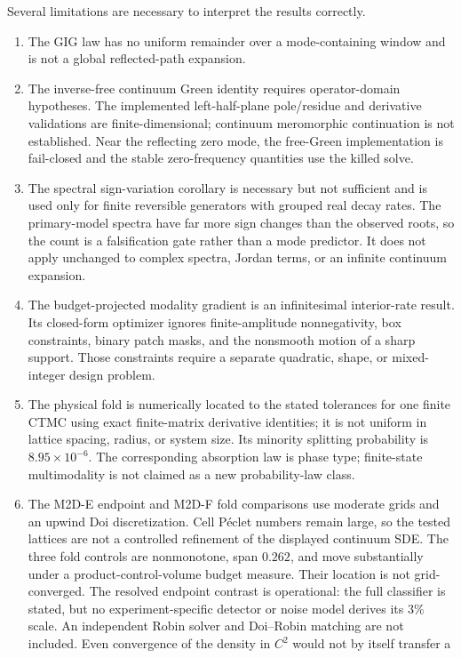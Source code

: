 \documentclass[aps,pre,reprint,amsmath,amssymb,longbibliography,floatfix]{revtex4-2}
\begin{document}
Several limitations are necessary to interpret the results correctly.
\begin{enumerate}
\item The GIG law has no uniform remainder over a mode-containing window and
is not a global reflected-path expansion.
\item The inverse-free continuum Green identity requires operator-domain
hypotheses. The implemented left-half-plane pole/residue and derivative
validations are finite-dimensional; continuum meromorphic continuation is not
established. Near the reflecting zero mode, the free-Green implementation is
fail-closed and the stable zero-frequency quantities use the killed solve.
\item The spectral sign-variation corollary is necessary but not sufficient
and is used only for finite reversible generators with grouped real decay
rates. The primary-model spectra have far more sign changes than the observed
roots, so the count is a falsification gate rather than a mode predictor. It
does not apply unchanged to complex spectra, Jordan terms, or an infinite
continuum expansion.
\item The budget-projected modality gradient is an infinitesimal interior-rate
result. Its closed-form optimizer ignores finite-amplitude nonnegativity, box
constraints, binary patch masks, and the nonsmooth motion of a sharp support.
Those constraints require a separate quadratic, shape, or mixed-integer
design problem.
\item The physical fold is numerically located to the stated tolerances for one
finite CTMC using exact finite-matrix derivative identities; it is not uniform
in lattice spacing, radius, or system size. Its minority splitting probability is
\(8.95\times10^{-6}\). The corresponding absorption law is phase type;
finite-state multimodality is not claimed as a new probability-law class.
\item The M2D-E endpoint and M2D-F fold comparisons use moderate grids and an upwind
Doi discretization. Cell P\'eclet numbers remain large, so the tested lattices
are not a controlled refinement of the displayed continuum SDE. The three
fold controls are nonmonotone, span \(0.262\), and move substantially under a
product-control-volume budget measure. Their location is not grid-converged.
The resolved endpoint contrast is operational: the full classifier is stated,
but no experiment-specific detector or noise model derives its 3\% scale.
An independent Robin solver and Doi--Robin matching are not included.
Even convergence of the density in \(C^2\) would not by itself transfer a

\end{enumerate}
\end{document}
